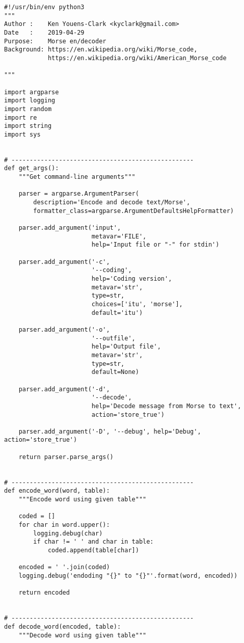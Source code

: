 \documentclass[]{article}
\begin{document}
\begin{verbatim}
#!/usr/bin/env python3
"""
Author :    Ken Youens-Clark <kyclark@gmail.com>
Date   :    2019-04-29
Purpose:    Morse en/decoder
Background: https://en.wikipedia.org/wiki/Morse_code,
            https://en.wikipedia.org/wiki/American_Morse_code

"""

import argparse
import logging
import random
import re
import string
import sys


# --------------------------------------------------
def get_args():
    """Get command-line arguments"""

    parser = argparse.ArgumentParser(
        description='Encode and decode text/Morse',
        formatter_class=argparse.ArgumentDefaultsHelpFormatter)

    parser.add_argument('input',
                        metavar='FILE',
                        help='Input file or "-" for stdin')

    parser.add_argument('-c',
                        '--coding',
                        help='Coding version',
                        metavar='str',
                        type=str,
                        choices=['itu', 'morse'],
                        default='itu')

    parser.add_argument('-o',
                        '--outfile',
                        help='Output file',
                        metavar='str',
                        type=str,
                        default=None)

    parser.add_argument('-d',
                        '--decode',
                        help='Decode message from Morse to text',
                        action='store_true')

    parser.add_argument('-D', '--debug', help='Debug', action='store_true')

    return parser.parse_args()


# --------------------------------------------------
def encode_word(word, table):
    """Encode word using given table"""

    coded = []
    for char in word.upper():
        logging.debug(char)
        if char != ' ' and char in table:
            coded.append(table[char])

    encoded = ' '.join(coded)
    logging.debug('endoding "{}" to "{}"'.format(word, encoded))

    return encoded


# --------------------------------------------------
def decode_word(encoded, table):
    """Decode word using given table"""


\end{verbatim}
\end{document}

